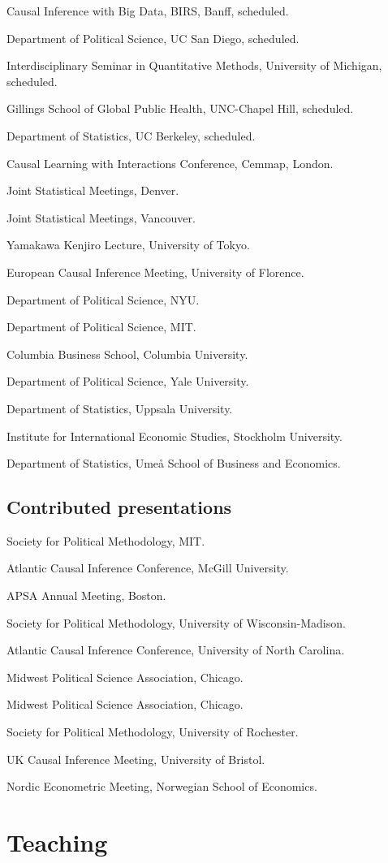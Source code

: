 \documentclass[10pt,letterpaper]{article}
\newenvironment{singledatelist}{
	\begin{list}{}{
		\setlength{\parskip}{0pt}
		\setlength{\itemsep}{4pt}
		\setlength{\parsep}{0.3em}
		\setlength{\leftmargin}{3.5em}
		\setlength{\labelwidth}{3.5em}
		\setlength{\labelsep}{1.5em}
		}
	}{
\end{list}
}
\newcommand{\dateitem}[2][]{\item[{#1}] {#2}}
\begin{document}
	\begin{singledatelist}
		\dateitem[2020]{Causal Inference with Big Data, BIRS, Banff, scheduled.}
		\dateitem{Department of Political Science, UC San Diego, scheduled.}
		\dateitem{Interdisciplinary Seminar in Quantitative Methods, University of Michigan, scheduled.}
		\dateitem{Gillings School of Global Public Health, UNC-Chapel Hill, scheduled.}
		\dateitem{Department of Statistics, UC Berkeley, scheduled.}
		\dateitem[2019]{Causal Learning with Interactions Conference, Cemmap, London.}
		\dateitem{Joint Statistical Meetings, Denver.}
		\dateitem[2018]{Joint Statistical Meetings, Vancouver.}
		\dateitem{Yamakawa Kenjiro Lecture, University of Tokyo.}
		\dateitem{European Causal Inference Meeting, University of Florence.}
		\dateitem{Department of Political Science, NYU.}
		\dateitem{Department of Political Science, MIT.}
		\dateitem[2016]{Columbia Business School, Columbia University.}
		\dateitem[2015]{Department of Political Science, Yale University.}
		\dateitem{Department of Statistics, Uppsala University.}
		\dateitem{Institute for International Economic Studies, Stockholm University.}
		\dateitem[2013]{Department of Statistics, Umeå School of Business and Economics.}
	\end{singledatelist}


	\subsection*{Contributed presentations}

	\begin{singledatelist}
		\dateitem[2019]{Society for Political Methodology, MIT.}
		\dateitem{Atlantic Causal Inference Conference, McGill University.}
		\dateitem[2018]{APSA Annual Meeting, Boston.}
		\dateitem[2017]{Society for Political Methodology, University of Wisconsin-Madison.}
		\dateitem{Atlantic Causal Inference Conference, University of North Carolina.}
		\dateitem{Midwest Political Science Association, Chicago.}
		\dateitem[2016]{Midwest Political Science Association, Chicago.}
		\dateitem[2015]{Society for Political Methodology, University of Rochester.}
		\dateitem{UK Causal Inference Meeting, University of Bristol.}
		\dateitem[2013]{Nordic Econometric Meeting, Norwegian School of Economics.}
	\end{singledatelist}


	\section*{Teaching}
\end{document}
